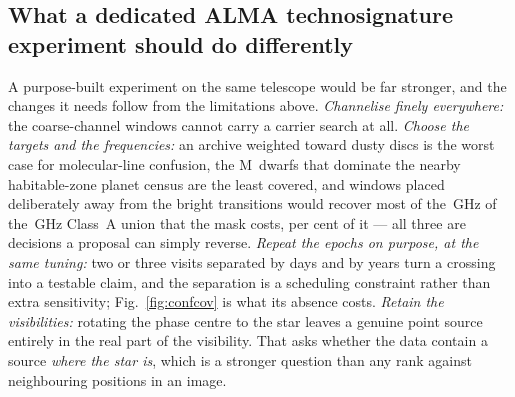 \subsection{What a dedicated ALMA technosignature experiment should do
differently}
\label{sec:future}

A purpose-built experiment on the same telescope would be far stronger, and
the changes it needs follow from the limitations above. \emph{Channelise
finely everywhere:} the \NCoarse{} coarse-channel windows cannot carry a
carrier search at all.
\emph{Choose the targets and the frequencies:} an archive weighted toward
dusty discs is the worst case for molecular-line confusion, the M~dwarfs that
dominate the nearby habitable-zone planet census are the least covered, and
windows placed deliberately away from the bright transitions would recover
most of the \MkMaskAGHz\,GHz of the \CvUnionA\,GHz Class~A union that the
mask costs, \MkMaskAPct{} per cent of it --- all three are decisions a
proposal can simply reverse. \emph{Repeat the epochs on purpose, at the same
tuning:} two or three visits separated by days and by years turn a crossing
into a testable claim, and the separation is a scheduling constraint rather
than extra sensitivity; Fig.~\ref{fig:confcov} is what its absence costs.
\emph{Retain the visibilities:} rotating the phase centre to the star leaves a
genuine point source entirely in the real part of the visibility. That asks
whether the data contain a source \emph{where the star is}, which is a
stronger question than any rank
against neighbouring positions in an image.


